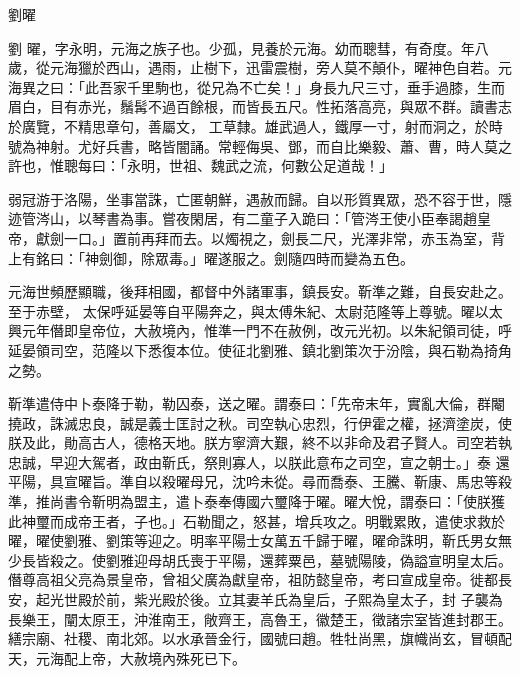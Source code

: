 
\begin{pinyinscope}

 劉曜



 劉
 曜，字永明，元海之族子也。少孤，見養於元海。幼而聰彗，有奇度。年八歲，從元海獵於西山，遇雨，止樹下，迅雷震樹，旁人莫不顛仆，曜神色自若。元海異之曰：「此吾家千里駒也，從兄為不亡矣！」身長九尺三寸，垂手過膝，生而眉白，目有赤光，鬚髯不過百餘根，而皆長五尺。性拓落高亮，與眾不群。讀書志於廣覽，不精思章句，善屬文，
 工草隸。雄武過人，鐵厚一寸，射而洞之，於時號為神射。尤好兵書，略皆闇誦。常輕侮吳、鄧，而自比樂毅、蕭、曹，時人莫之許也，惟聰每曰：「永明，世祖、魏武之流，何數公足道哉！」



 弱冠游于洛陽，坐事當誅，亡匿朝鮮，遇赦而歸。自以形質異眾，恐不容于世，隱迹管涔山，以琴書為事。嘗夜閑居，有二童子入跪曰：「管涔王使小臣奉謁趙皇帝，獻劍一口。」置前再拜而去。以燭視之，劍長二尺，光澤非常，赤玉為室，背上有銘曰：「神劍御，除眾毒。」曜遂服之。劍隨四時而變為五色。



 元海世頻歷顯職，後拜相國，都督中外諸軍事，鎮長安。靳準之難，自長安赴之。至于赤壁，
 太保呼延晏等自平陽奔之，與太傅朱紀、太尉范隆等上尊號。曜以太興元年僭即皇帝位，大赦境內，惟準一門不在赦例，改元光初。以朱紀領司徒，呼延晏領司空，范隆以下悉復本位。使征北劉雅、鎮北劉策次于汾陰，與石勒為掎角之勢。



 靳準遣侍中卜泰降于勒，勒囚泰，送之曜。謂泰曰：「先帝末年，實亂大倫，群閹撓政，誅滅忠良，誠是義士匡討之秋。司空執心忠烈，行伊霍之權，拯濟塗炭，使朕及此，勛高古人，德格天地。朕方寧濟大艱，終不以非命及君子賢人。司空若執忠誠，早迎大駕者，政由靳氏，祭則寡人，以朕此意布之司空，宣之朝士。」泰
 還平陽，具宣曜旨。準自以殺曜母兄，沈吟未從。尋而喬泰、王騰、靳康、馬忠等殺準，推尚書令靳明為盟主，遣卜泰奉傳國六璽降于曜。曜大悅，謂泰曰：「使朕獲此神璽而成帝王者，子也。」石勒聞之，怒甚，增兵攻之。明戰累敗，遣使求救於曜，曜使劉雅、劉策等迎之。明率平陽士女萬五千歸于曜，曜命誅明，靳氏男女無少長皆殺之。使劉雅迎母胡氏喪于平陽，還葬粟邑，墓號陽陵，偽謚宣明皇太后。僭尊高祖父亮為景皇帝，曾祖父廣為獻皇帝，祖防懿皇帝，考曰宣成皇帝。徙都長安，起光世殿於前，紫光殿於後。立其妻羊氏為皇后，子熙為皇太子，封
 子襲為長樂王，闡太原王，沖淮南王，敞齊王，高魯王，徽楚王，徵諸宗室皆進封郡王。繕宗廟、社稷、南北郊。以水承晉金行，國號曰趙。牲牡尚黑，旗幟尚玄，冒頓配天，元海配上帝，大赦境內殊死已下。




\end{pinyinscope}
